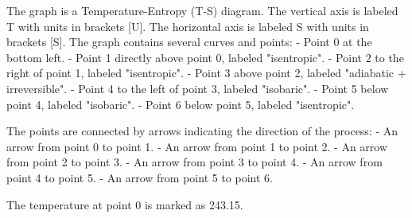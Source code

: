 The graph is a Temperature-Entropy (T-S) diagram. The vertical axis is labeled T with units in brackets [U]. The horizontal axis is labeled S with units in brackets [S]. The graph contains several curves and points:
- Point 0 at the bottom left.
- Point 1 directly above point 0, labeled "isentropic".
- Point 2 to the right of point 1, labeled "isentropic".
- Point 3 above point 2, labeled "adiabatic + irreversible".
- Point 4 to the left of point 3, labeled "isobaric".
- Point 5 below point 4, labeled "isobaric".
- Point 6 below point 5, labeled "isentropic".

The points are connected by arrows indicating the direction of the process:
- An arrow from point 0 to point 1.
- An arrow from point 1 to point 2.
- An arrow from point 2 to point 3.
- An arrow from point 3 to point 4.
- An arrow from point 4 to point 5.
- An arrow from point 5 to point 6.

The temperature at point 0 is marked as 243.15.